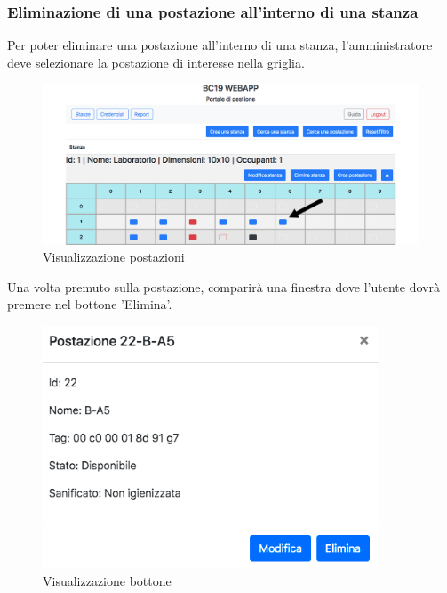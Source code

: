 \subsubsection{Eliminazione di una postazione all'interno di una stanza}
Per poter eliminare una postazione all'interno di una stanza, l'amministratore deve selezionare la postazione di interesse nella griglia.
\begin{figure}[H]
	\centering
	\includegraphics[width=15cm]{res/images/postDaEliminare.png}
	\caption{Visualizzazione postazioni}
\end{figure}
Una volta premuto sulla postazione, comparirà una finestra dove l'utente dovrà premere nel bottone 'Elimina'.
\begin{figure}[H]
	\centering
	\includegraphics[width=10cm]{res/images/bottoneCestinoWorkstation.png}
	\caption{Visualizzazione bottone}
\end{figure}

